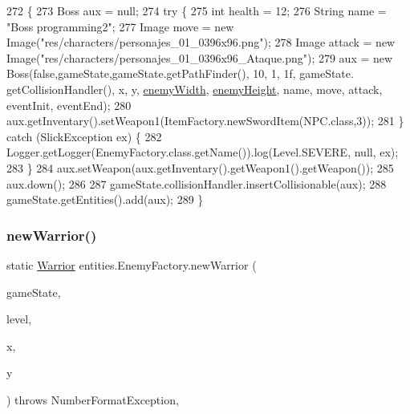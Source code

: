 \begin{DoxyCode}
272                                                                                                            
                                          \{
273         Boss aux = null;
274         \textcolor{keywordflow}{try} \{
275             \textcolor{keywordtype}{int} health = 12;
276             String name = \textcolor{stringliteral}{"Boss programming2"};
277             Image move = \textcolor{keyword}{new} Image(\textcolor{stringliteral}{"res/characters/personajes\_01\_0396x96.png"});
278             Image attack = \textcolor{keyword}{new} Image(\textcolor{stringliteral}{"res/characters/personajes\_01\_0396x96\_Ataque.png"});
279             aux = \textcolor{keyword}{new} Boss(\textcolor{keyword}{false},gameState,gameState.getPathFinder(), 10, 1, 1f, gameState.
      getCollisionHandler(), x, y, \mbox{\hyperlink{classentities_1_1_enemy_factory_a3396d252fc506310c58e3a32494bbe36}{enemyWidth}}, \mbox{\hyperlink{classentities_1_1_enemy_factory_aa4632fbf138ccc9cc222e7437ccd8284}{enemyHeight}}, name, move, attack, eventInit, eventEnd);
280             aux.getInventary().setWeapon1(ItemFactory.newSwordItem(NPC.class,3));
281         \} \textcolor{keywordflow}{catch} (SlickException ex) \{
282             Logger.getLogger(EnemyFactory.class.getName()).log(Level.SEVERE, null, ex);
283         \}
284         aux.setWeapon(aux.getInventary().getWeapon1().getWeapon());
285         aux.down();
286 
287         gameState.collisionHandler.insertCollisionable(aux);
288         gameState.getEntities().add(aux);
289     \}
\end{DoxyCode}
\mbox{\label{classentities_1_1_enemy_factory_ad72ed81380d9690750ce9abf6046684c}} 
\subsubsection{\texorpdfstring{new\+Warrior()}{newWarrior()}}
{\footnotesize\ttfamily static \mbox{\hyperlink{classentities_1_1_warrior}{Warrior}} entities.\+Enemy\+Factory.\+new\+Warrior (\begin{DoxyParamCaption}\item[{\mbox{\hyperlink{classstates_1_1_game_state}{Game\+State}}}]{game\+State,  }\item[{int}]{level,  }\item[{int}]{x,  }\item[{int}]{y }\end{DoxyParamCaption}) throws Number\+Format\+Exception\hspace{0.3cm}{\ttfamily [inline]}, {\ttfamily [static]}}


